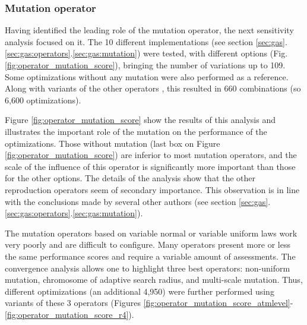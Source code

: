 \documentclass{ametsoc}
\begin{document}
\subsubsection{Mutation operator}
\label{sec:assessment:mutation}

Having identified the leading role of the mutation operator, the next sensitivity analysis focused on it. The 10 different implementations (see section \ref{sec:gas}.\ref{sec:gas:operators}.\ref{sec:gas:mutation}) were tested, with different options (Fig. \ref{fig:operator_mutation_score}), bringing the number of variations up to 109. Some optimizations without any mutation were also performed as a reference. Along with variants of the other operators \citep[see][for the details]{Horton2012a}, this resulted in 660 combinations (so 6,600 optimizations).

Figure \ref{fig:operator_mutation_score} show the results of this analysis and illustrates the important role of the mutation on the performance of the optimizations. Those without mutation (last box on Figure \ref{fig:operator_mutation_score}) are inferior to most mutation operators, and the scale of the influence of this operator is significantly more important than those for the other options. The details of the analysis \citep[see][]{Horton2012a} show that the other reproduction operators seem of secondary importance. This observation is in line with the conclusions made by several other authors (see section \ref{sec:gas}.\ref{sec:gas:operators}.\ref{sec:gas:mutation}).

The mutation operators based on variable normal or variable uniform laws work very poorly and are difficult to configure. Many operators present more or less the same performance scores and require a variable amount of assessments. The convergence analysis \citep[see][]{Horton2012a} allows one to highlight three best operators: non-uniform mutation, chromosome of adaptive search radius, and multi-scale mutation. Thus, different optimizations (an additional 4,950) were further performed using variants of these 3 operators (Figures \ref{fig:operator_mutation_score_atmlevel}-\ref{fig:operator_mutation_score_r4}).
\end{document}
